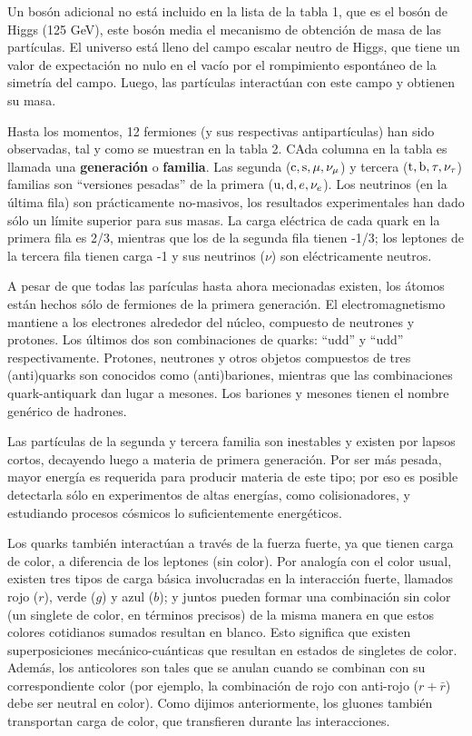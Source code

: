 \documentclass[a4paper,12pt]{article}
\begin{document}
Un bosón adicional no está incluido en la lista de la tabla 1, que es el bosón de Higgs (125 GeV), este bosón media el mecanismo de obtención de masa de las partículas. El universo está lleno del campo escalar neutro de Higgs, que tiene un valor de expectación no nulo en el vacío por el rompimiento espontáneo de la simetría del campo. Luego, las partículas interactúan con este campo y obtienen su masa. 

Hasta los momentos, 12 fermiones (y sus respectivas antipartículas) han sido observadas, tal y como se muestran en la tabla 2. CAda columna en la tabla es llamada una \textbf{generación} o \textbf{familia}. Las segunda (${\mathrm c},{\mathrm s},\mu,\nu_\mu$) y tercera (${\mathrm t},{\mathrm b},\tau,\nu_\tau$) familias son ``versiones pesadas'' de la primera (${\mathrm u},{\mathrm d},e,\nu_e$). Los neutrinos (en la última fila) son prácticamente no-masivos, los resultados experimentales han dado sólo un límite superior para sus masas. La carga eléctrica de cada quark en la primera fila es 2/3, mientras que los de la segunda fila tienen -1/3; los leptones de la tercera fila tienen carga -1 y sus neutrinos ($\nu$) son eléctricamente neutros.

A pesar de que todas las parículas hasta ahora mecionadas existen, los átomos están hechos sólo de fermiones de la primera generación. El electromagnetismo mantiene a los electrones alrededor del núcleo, compuesto de neutrones y protones. Los últimos dos son combinaciones de quarks: ``udd'' y ``udd'' respectivamente. Protones, neutrones y otros objetos compuestos de tres (anti)quarks son conocidos como (anti)bariones, mientras que las combinaciones quark-antiquark dan lugar a mesones. Los bariones y mesones tienen el nombre genérico de hadrones.

Las partículas de la segunda y tercera familia son inestables y existen por lapsos cortos, decayendo luego a materia de primera generación. Por ser más pesada, mayor energía es requerida para producir materia de este tipo; por eso es posible detectarla sólo en experimentos de altas energías, como colisionadores, y estudiando procesos cósmicos lo suficientemente energéticos.

Los quarks también interactúan a través de la fuerza fuerte, ya que tienen carga de color, a diferencia de los leptones (sin color). Por analogía con el color usual, existen tres tipos de carga básica involucradas en la interacción fuerte, llamados rojo ($r$), verde ($g$) y azul ($b$); y juntos pueden formar una combinación sin color (un singlete de color, en términos precisos) de la misma manera en que estos colores cotidianos sumados resultan en blanco. Esto significa que existen superposiciones mecánico-cuánticas que resultan en estados de singletes de color. Además, los anticolores son tales que se anulan cuando se combinan con su correspondiente color (por ejemplo, la combinación de rojo con anti-rojo ($r+\bar{r}$) debe ser neutral en color). Como dijimos anteriormente, los gluones también transportan carga de color, que transfieren durante las interacciones.
\end{document}
